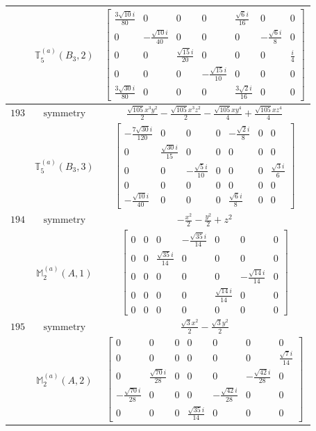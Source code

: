 \documentclass[fleqn,8pt,landscape]{jsarticle}
\begin{document}
\begin{longtable}{ccc}
$  $ & $ \mathbb{T}_{5}^{(a)}(B_{3},2) $ & $ \begin{bmatrix} \frac{3 \sqrt{10} i}{80} & 0 & 0 & 0 & \frac{\sqrt{6} i}{16} & 0 & 0 \\ 0 & - \frac{\sqrt{10} i}{40} & 0 & 0 & 0 & - \frac{\sqrt{6} i}{8} & 0 \\ 0 & 0 & \frac{\sqrt{15} i}{20} & 0 & 0 & 0 & \frac{i}{4} \\ 0 & 0 & 0 & - \frac{\sqrt{15} i}{10} & 0 & 0 & 0 \\ \frac{3 \sqrt{30} i}{80} & 0 & 0 & 0 & \frac{3 \sqrt{2} i}{16} & 0 & 0 \end{bmatrix} $ \\ \hline
$ 193 $ & $ \text{symmetry} $ & $ \frac{\sqrt{105} x^{3} y^{2}}{2} - \frac{\sqrt{105} x^{3} z^{2}}{2} - \frac{\sqrt{105} x y^{4}}{4} + \frac{\sqrt{105} x z^{4}}{4} $ \\
$  $ & $ \mathbb{T}_{5}^{(a)}(B_{3},3) $ & $ \begin{bmatrix} - \frac{7 \sqrt{30} i}{120} & 0 & 0 & 0 & - \frac{\sqrt{2} i}{8} & 0 & 0 \\ 0 & \frac{\sqrt{30} i}{15} & 0 & 0 & 0 & 0 & 0 \\ 0 & 0 & - \frac{\sqrt{5} i}{10} & 0 & 0 & 0 & \frac{\sqrt{3} i}{6} \\ 0 & 0 & 0 & 0 & 0 & 0 & 0 \\ - \frac{\sqrt{10} i}{40} & 0 & 0 & 0 & \frac{\sqrt{6} i}{8} & 0 & 0 \end{bmatrix} $ \\ \hline
$ 194 $ & $ \text{symmetry} $ & $ - \frac{x^{2}}{2} - \frac{y^{2}}{2} + z^{2} $ \\
$  $ & $ \mathbb{M}_{2}^{(a)}(A,1) $ & $ \begin{bmatrix} 0 & 0 & 0 & - \frac{\sqrt{35} i}{14} & 0 & 0 & 0 \\ 0 & 0 & \frac{\sqrt{35} i}{14} & 0 & 0 & 0 & 0 \\ 0 & 0 & 0 & 0 & 0 & - \frac{\sqrt{14} i}{14} & 0 \\ 0 & 0 & 0 & 0 & \frac{\sqrt{14} i}{14} & 0 & 0 \\ 0 & 0 & 0 & 0 & 0 & 0 & 0 \end{bmatrix} $ \\ \hline
$ 195 $ & $ \text{symmetry} $ & $ \frac{\sqrt{3} x^{2}}{2} - \frac{\sqrt{3} y^{2}}{2} $ \\
$  $ & $ \mathbb{M}_{2}^{(a)}(A,2) $ & $ \begin{bmatrix} 0 & 0 & 0 & 0 & 0 & 0 & 0 \\ 0 & 0 & 0 & 0 & 0 & 0 & \frac{\sqrt{7} i}{14} \\ 0 & \frac{\sqrt{70} i}{28} & 0 & 0 & 0 & - \frac{\sqrt{42} i}{28} & 0 \\ - \frac{\sqrt{70} i}{28} & 0 & 0 & 0 & - \frac{\sqrt{42} i}{28} & 0 & 0 \\ 0 & 0 & 0 & \frac{\sqrt{35} i}{14} & 0 & 0 & 0 \end{bmatrix} $ \\ \hline

\end{longtable}
\end{document}
